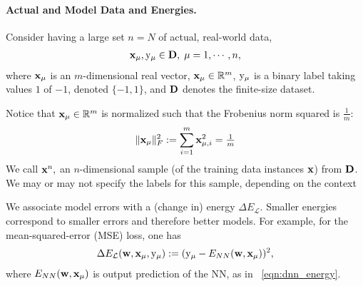 \paragraph{Actual and Model Data and Energies.}


Consider having a large set $n=N$ of actual, real-world data, 
\begin{align}
  \label{eqn:x}
  {\mathbf{x}}_{\mu}, \mathrm{y}_{\mu} \in\mathbf{D},\;\mu=1, \cdots, n,
\end{align}
where 
${\mathbf{x}}_{\mu}$ is an $m$-dimensional real vector, 
${\mathbf{x}}_{\mu}\in\mathbb{R}^{m}$,
$\mathrm{y}_{\mu}$ is a binary label taking values $1$ of $-1$, denoted $\{-1,1\}$, and 
$\mathbf{D}$ denotes the finite-size dataset.

Notice that ${\mathbf{x}}_{\mu}\in\mathbb{R}^{m}$ is normalized such that the Frobenius norm squared is $\tfrac{1}{m}$:
  \begin{equation}
    \label{eqn:XVEC_norm}
   \Vert{\mathbf{x}}_{\mu}\Vert^{2}_{F} := \sum_{i=1}^{m} {\mathbf{x}}_{\mu,i}^{2}=\tfrac{1}{m}
  \end{equation}
We call ${\mathbf{x}}^{n},$ an $n$-dimensional sample (of the training data instances ${\mathbf{x}}$) from $\mathbf{D}$.  We may or may not specify the labels for this sample, depending on the context

We associate model errors
with a (change in) energy $\Delta E_{\mathcal{L}}$. Smaller energies correspond to smaller errors and therefore better models.
For example, for the mean-squared-error (MSE) loss, one has
\begin{align}
  \label{eqn:DEy}
  \Delta E_{\mathcal{L}}({\mathbf{w}},{\mathbf{x}}_{\mu},\mathrm{y}_{\mu}):= (\mathrm{y}_{\mu}-E_{NN}({\mathbf{w}},{\mathbf{x}}_{\mu}))^{2}  ,
\end{align}
where 
$E_{NN}({\mathbf{w}},{\mathbf{x}}_{\mu})$ is output prediction of the NN, as in \EQN~\ref{eqn:dnn_energy}.

